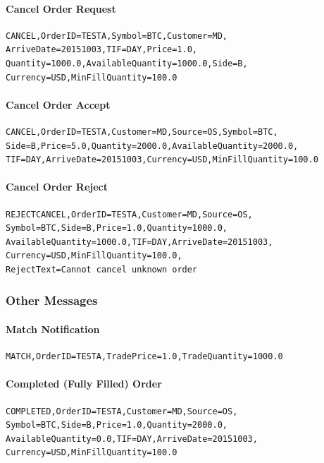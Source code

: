 \documentclass[Letter]{article}
\begin{document}
\paragraph{Cancel Order Request}
\begin{verbatim}
CANCEL,OrderID=TESTA,Symbol=BTC,Customer=MD,
ArriveDate=20151003,TIF=DAY,Price=1.0,
Quantity=1000.0,AvailableQuantity=1000.0,Side=B,
Currency=USD,MinFillQuantity=100.0
\end{verbatim}

\paragraph{Cancel Order Accept}
\begin{verbatim}
CANCEL,OrderID=TESTA,Customer=MD,Source=OS,Symbol=BTC,
Side=B,Price=5.0,Quantity=2000.0,AvailableQuantity=2000.0,
TIF=DAY,ArriveDate=20151003,Currency=USD,MinFillQuantity=100.0
\end{verbatim}

\paragraph{Cancel Order Reject}
\begin{verbatim}
REJECTCANCEL,OrderID=TESTA,Customer=MD,Source=OS,
Symbol=BTC,Side=B,Price=1.0,Quantity=1000.0,
AvailableQuantity=1000.0,TIF=DAY,ArriveDate=20151003,
Currency=USD,MinFillQuantity=100.0,
RejectText=Cannot cancel unknown order
\end{verbatim}

\subsubsection{Other Messages}

\paragraph{Match Notification}
\begin{verbatim}
MATCH,OrderID=TESTA,TradePrice=1.0,TradeQuantity=1000.0
\end{verbatim}

\paragraph{Completed (Fully Filled) Order}
\begin{verbatim}
COMPLETED,OrderID=TESTA,Customer=MD,Source=OS,
Symbol=BTC,Side=B,Price=1.0,Quantity=2000.0,
AvailableQuantity=0.0,TIF=DAY,ArriveDate=20151003,
Currency=USD,MinFillQuantity=100.0
\end{verbatim}
\end{document}
